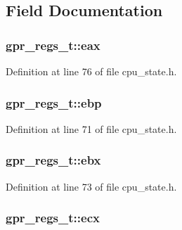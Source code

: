\subsection{\-Field \-Documentation}
\hypertarget{structgpr__regs__t_af829d186724a11f28e98bfb592796bbc}{
\subsubsection[{eax}]{ {\bf gpr\-\_\-regs\-\_\-t\-::eax}}}\label{structgpr__regs__t_af829d186724a11f28e98bfb592796bbc}


\-Definition at line 76 of file cpu\-\_\-state.\-h.

\hypertarget{structgpr__regs__t_aac80e4ad6c812aef5f62cca8cc2d601a}{
\subsubsection[{ebp}]{ {\bf gpr\-\_\-regs\-\_\-t\-::ebp}}}\label{structgpr__regs__t_aac80e4ad6c812aef5f62cca8cc2d601a}


\-Definition at line 71 of file cpu\-\_\-state.\-h.

\hypertarget{structgpr__regs__t_ab0eeaf724d891bb43e994a484f99ccc1}{
\subsubsection[{ebx}]{ {\bf gpr\-\_\-regs\-\_\-t\-::ebx}}}\label{structgpr__regs__t_ab0eeaf724d891bb43e994a484f99ccc1}


\-Definition at line 73 of file cpu\-\_\-state.\-h.

\hypertarget{structgpr__regs__t_aef035a70e62d22286938128fb55fb9d1}{
\subsubsection[{ecx}]{ {\bf gpr\-\_\-regs\-\_\-t\-::ecx}}}\label{structgpr__regs__t_aef035a70e62d22286938128fb55fb9d1}


